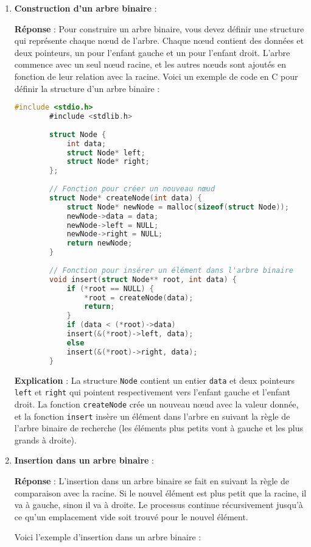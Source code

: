 \begin{enumerate}
	\item \textbf{Construction d'un arbre binaire} :
	
	\textbf{Réponse} :
	Pour construire un arbre binaire, vous devez définir une structure qui représente chaque nœud de l'arbre. Chaque nœud contient des données et deux pointeurs, un pour l'enfant gauche et un pour l'enfant droit. L'arbre commence avec un seul nœud racine, et les autres nœuds sont ajoutés en fonction de leur relation avec la racine. Voici un exemple de code en C pour définir la structure d'un arbre binaire :
	
	\begin{lstlisting}[language=C]
		#include <stdio.h>
		#include <stdlib.h>
		
		struct Node {
			int data;
			struct Node* left;
			struct Node* right;
		};
		
		// Fonction pour créer un nouveau nœud
		struct Node* createNode(int data) {
			struct Node* newNode = malloc(sizeof(struct Node));
			newNode->data = data;
			newNode->left = NULL;
			newNode->right = NULL;
			return newNode;
		}
		
		// Fonction pour insérer un élément dans l'arbre binaire
		void insert(struct Node** root, int data) {
			if (*root == NULL) {
				*root = createNode(data);
				return;
			}
			if (data < (*root)->data)
			insert(&(*root)->left, data);
			else
			insert(&(*root)->right, data);
		}
	\end{lstlisting}
	
	\textbf{Explication} :
	La structure \texttt{Node} contient un entier \texttt{data} et deux pointeurs \texttt{left} et \texttt{right} qui pointent respectivement vers l'enfant gauche et l'enfant droit. La fonction \texttt{createNode} crée un nouveau nœud avec la valeur donnée, et la fonction \texttt{insert} insère un élément dans l'arbre en suivant la règle de l'arbre binaire de recherche (les éléments plus petits vont à gauche et les plus grands à droite).
	
	\item \textbf{Insertion dans un arbre binaire} :
	
	\textbf{Réponse} :
	L'insertion dans un arbre binaire se fait en suivant la règle de comparaison avec la racine. Si le nouvel élément est plus petit que la racine, il va à gauche, sinon il va à droite. Le processus continue récursivement jusqu'à ce qu'un emplacement vide soit trouvé pour le nouvel élément.
	
	Voici l'exemple d'insertion dans un arbre binaire :
	

\end{enumerate}
